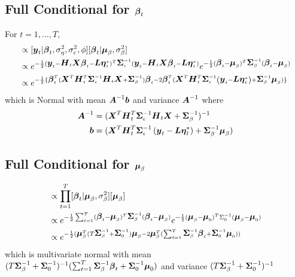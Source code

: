 \documentclass[fleqn]{article}
\def\bm#1{\mbox{\boldmath $#1$}}
\begin{document}
\subsection{Full Conditional for $\bm{\beta}_t$}
%
For $t = 1, \ldots, T$,
\begin{align*}
[\bm{\beta}_t | \cdot] & \propto [\bm{y}_t | \bm{\beta}_t, \sigma^2_\eta, \sigma^2_\epsilon, \phi] [\bm{\beta}_t | \bm{\mu}_\beta, \sigma^2_\beta]\\
%
& \propto e^{ - \frac{1} {2} (\bm{y}_t - \bm{H}_t \bm{X} \bm{\beta}_t - \bm{L} \bm{\eta}^*_t)^T \bm{\Sigma}_{\epsilon}^{ - 1} (\bm{y}_t - \bm{H}_t \bm{X} \bm{\beta}_t - \bm{L} \bm{\eta}^*_t)} e^{ - \frac{1} {2} (\bm{\beta}_t - \bm{\mu}_\beta)^T \bm{\Sigma}_\beta^{ - 1} (\bm{\beta}_t - \bm{\mu}_\beta)}\\
%
& \propto e^{ - \frac{1} {2} \{\bm{\beta}_t^T (\bm{X}^T \bm{H}_t^T \bm{\Sigma}_\epsilon^{ - 1} \bm{H}_t \bm{X} + \bm{\Sigma}_\beta^{ - 1}) \bm{\beta}_t - 2 \bm{\beta}_t^T (\bm{X}^T \bm{H}_t^T \bm{\Sigma}_\epsilon^{ - 1} \left( \bm{y}_t - \bm{L} \bm{\eta}^*_t \right) + \bm{\Sigma}_\beta^{ - 1} \bm{\mu}_\beta) \} }
\end{align*}
%
which is Normal with mean $ \bm{A}^{ - 1} \bm{b}$ and variance $\bm{A}^{ - 1}$ where
\begin{align*}
  \bm{A}^{ - 1} & = (\bm{X}^T \bm{H}_t^T \bm{\Sigma}_\epsilon^{ - 1} \bm{H}_t \bm{X} + \bm{\Sigma}_\beta^{ - 1})^{ - 1}\\
  \bm{b} & = (\bm{X}^T \bm{H}_t^T \bm{\Sigma}_\epsilon^{ - 1} \left( \bm{y}_t - \bm{L} \bm{\eta}^*_t \right) + \bm{\Sigma}_\beta^{ - 1} \bm{\mu}_\beta)\\
\end{align*}
%
\subsection{Full Conditional for $\bm{\mu}_\beta$}
%
\begin{align*}
[\bm{\mu}_\beta | \cdot] & \propto \prod_{t = 1}^T [\bm{\beta}_t | \bm{\mu}_\beta, \sigma^2_\beta] [\bm{\mu}_\beta]\\
%
& \propto e^{ - \frac{1} {2} \sum_{t = 1}^T (\bm{\beta}_t - \bm{\mu}_\beta)^T \bm{\Sigma}_\beta^{ - 1} (\bm{\beta}_t - \bm{\mu}_\beta)} e^{ - \frac{1} {2} (\bm{\mu}_\beta - \bm{\mu}_0)^T \Sigma_0^{ - 1} (\bm{\mu}_\beta - \bm{\mu}_0)}\\
%
& \propto e^{ - \frac{1} {2} (
\bm{\mu}_\beta^T (T \bm{\Sigma}_\beta^{ - 1} + \bm{\Sigma}_0^{ - 1}) \bm{\mu}_\beta - 2 \bm{\mu}_\beta^T (\sum_{t = 1}^T \bm{\Sigma}_\beta^{ - 1} \bm{\beta}_t + \bm{\Sigma}_0^{ - 1} \bm{\mu}_0) ) }
\end{align*}
%
which is multivariate normal with mean
$(T \bm{\Sigma}_\beta^{ - 1} + \bm{\Sigma}_0^{ - 1})^{ - 1} (\sum_{t = 1}^T \bm{\Sigma}_\beta^{ - 1} \bm{\beta}_t + \bm{\Sigma}_0^{ - 1} \bm{\mu}_0)$ and variance $(T \bm{\Sigma}_\beta^{ - 1} + \bm{\Sigma}_0^{ - 1})^{ - 1}$
%
\end{document}
